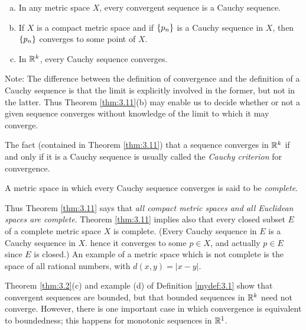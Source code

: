 
\begin{thm}
    \label{thm:3.11}
    \begin{enumerate}[(a)]
        \item In any metric space $X$, every convergent sequence is a Cauchy sequence.
        \item If $X$ is a compact metric space and if $\protect\{p_n\}$ is a Cauchy sequence in $X$, then $\protect\{p_n\}$ converges to some point of $X$.
        \item In ${\protect\mathbb R}^{k}$, every Cauchy sequence converges.
    \end{enumerate}
\end{thm}

Note: The difference between the definition of convergence and
the definition of a Cauchy sequence is that the limit is explicitly involved
in the former, but not in the latter. 
Thus Theorem \ref{thm:3.11}(b) may enable us
to decide whether or not a given sequence converges without knowledge
of the limit to which it may converge.

The fact (contained in Theorem \ref{thm:3.11}) that a sequence converges in
${\protect\mathbb R}^{k}$ if and only if it is a Cauchy sequence is usually called the 
\emph{Cauchy criterion} for convergence.

\begin{mydef}
    \label{mydef:3.12}
    A metric space in which every Cauchy sequence converges is
    said to be \emph{complete}.
\end{mydef}


Thus Theorem \ref{thm:3.11} says that \emph{all compact metric spaces and all Euclidean spaces are complete}. 
Theorem \ref{thm:3.11} implies also that every closed subset $E$ of a complete metric space $X$ is complete. 
(Every Cauchy sequence in $E$ is a Cauchy sequence in $X$. 
hence it converges to some $p \in X$, and actually $p \in E$ since $E$ is closed.) 
An example of a metric space which is not complete is the space of all
rational numbers, with $d(x, y) = |x - y|$.

Theorem \ref{thm:3.2}(c) and example (d) of Definition \ref{mydef:3.1} show that convergent sequences are bounded, but that bounded sequences in ${\protect\mathbb R}^{k}$ need not converge. However, there is one important case in which convergence is equivalent to boundedness; this happens for monotonic sequences in ${\protect\mathbb R}^{1}$.


